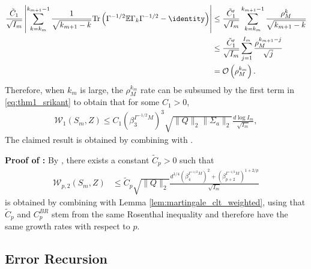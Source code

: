 \documentclass[11pt]{article}
\begin{document}
\begin{align*}
    \frac{\tilde{C}_1}{\sqrt{I_m}} \left\lvert 
    \sum_{k=k_m}^{k_{m+1} - 1} \frac{1}{\sqrt{k_{m+1} - k}}
  \mathrm{Tr} \left( \Gamma^{-1/2}\mathbb{E}\Gamma_k \Gamma^{-1/2} - \identity \right)  \right\rvert
    & \leq 
    \frac{\tilde{C}_1'}{\sqrt{I_m}} 
    \sum_{k=k_m}^{k_{m+1} - 1} \frac{\rho_M^k}{\sqrt{k_{m+1} - k}}
    \\ &
    \leq \frac{\tilde{C}_1'}{\sqrt{I_m}} \sum_{j=1}^{I_m} \frac{\rho_M^{k_{m+1} - j}}{\sqrt{j}}
    \\ &
    = \mathcal{O}\left(\rho_M^{k_m}\right) .
\end{align*}
Therefore, when $k_m$ is large, the $\rho_M^{k_m}$ rate can be subsumed by the first term in \eqref{eq:thm1_srikant} to obtain that for some $C_1 > 0$, 
\begin{align*}
    \mathcal{W}_1 (S_m, Z) 
    \leq
    C_1\left(\beta_3^{\Gamma^{-1/2} M} \right)^3 \sqrt{\lVert Q \rVert_2 \lVert \Sigma_a \rVert_2} \frac{d \log I_m}{\sqrt{I_m}}
    ,
\end{align*}
The claimed result is obtained by combining with . 



\textbf{Proof of :}
By \citep[Theorem 1]{bonis2020steinsmethodnormalapproximation}, there exists a constant $\tilde{C}_p > 0$ such that
\begin{align*}
    \mathcal{W}_{p, 2} (S_m, Z) 
    &\leq 
    \tilde{C}_p \sqrt{\lVert Q \rVert_2}\frac{d^{1/4} (\beta_4^{\Gamma^{-1/2}M})^2 + (\beta_{p+2}^{\Gamma^{-1/2}M})^{1+2/p} }{\sqrt{I_m}}
\end{align*}
 is obtained by combining with Lemma \ref{lem:martingale_clt_weighted}, using that $\tilde{C}_p$ and $C_p^{BR}$ stem from the same Rosenthal inequality and therefore have the same growth rates with respect to $p$. 








    


\subsection{Error Recursion}\label{app:error_recursion}
\end{document}
